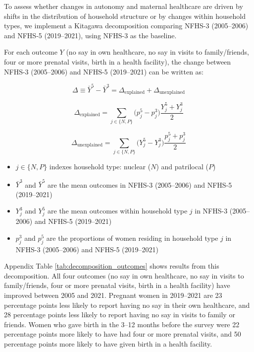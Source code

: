 \documentclass[10pt,twoside,reqno]{article}
\begin{document}
To assess whether changes in autonomy and maternal healthcare are driven by shifts in the distribution of household structure or by changes within household types, we implement a Kitagawa decomposition \citep{kitagawa1955components} comparing NFHS-3 (2005--2006) and NFHS-5 (2019--2021), using NFHS-3 as the baseline.

For each outcome $Y$ (no say in own healthcare, no say in visits to family/friends, four or more prenatal visits, birth in a health facility), the change between NFHS-3 (2005--2006) and NFHS-5 (2019--2021) can be written as:

\begin{equation}
\Delta \equiv \bar Y^{5} - \bar Y^{3}
= \Delta_{\text{explained}} + \Delta_{\text{unexplained}}
\end{equation}

\begin{equation}
\Delta_{\text{explained}} =
\sum_{j \in \{N,P\}} \big(p_j^{5} - p_j^{3}\big)\frac{Y_j^{5} + Y_j^{3}}{2}
\end{equation}

\begin{equation}
\Delta_{\text{unexplained}} =
\sum_{j \in \{N,P\}} \big(Y_j^{5} - Y_j^{3}\big)\frac{p_j^{5} + p_j^{3}}{2}
\end{equation}

\begin{itemize}
    \item $j \in \{N,P\}$ indexes household type: nuclear ($N$) and patrilocal ($P$)
    \item $\bar Y^{3}$ and $\bar Y^{5}$ are the mean outcomes in NFHS-3 (2005--2006) and NFHS-5 (2019--2021)
    \item $Y_j^{3}$ and $Y_j^{5}$ are the mean outcomes within household type $j$ in NFHS-3 (2005--2006) and NFHS-5 (2019--2021)
    \item $p_j^{3}$ and $p_j^{5}$ are the proportions of women residing in household type $j$ in NFHS-3 (2005--2006) and NFHS-5 (2019--2021)
\end{itemize}


Appendix Table \ref{tab:decomposition_outcomes} shows results from this decomposition. All four outcomes (no say in own healthcare, no say in visits to family/friends, four or more prenatal visits, birth in a health facility) have improved between 2005 and 2021. Pregnant women in 2019--2021 are 23 percentage points less likely to report having no say in their own healthcare, and 28 percentage points less likely to report having no say in visits to family or friends. Women who gave birth in the 3--12 months before the survey were 22 percentage points more likely to have had four or more prenatal visits, and 50 percentage points more likely to have given birth in a health facility. 
\end{document}
